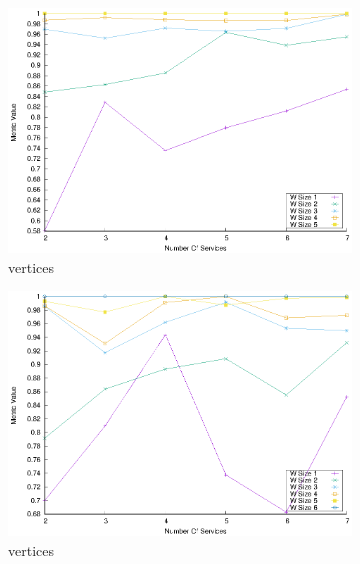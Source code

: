 \begin{figure}[!htb]
\begin{subfigure}{0.48\textwidth}
    \includegraphics[width=\textwidth]{Images/graphs/window_quality_performance_diff_perce_n7_s7_20_100_n5}
    \caption{ vertices}
    \label{fig:quality_window_perce_wide_5n}
  \end{subfigure}
  \hfill
  \begin{subfigure}{0.48\textwidth}
    \includegraphics[width=\textwidth]{Images/graphs/window_quality_performance_diff_perce_n7_s7_20_100_n6}
    \caption{ vertices}
    \label{fig:quality_window_perce_wide_6n}
  \end{subfigure}
  \begin{subfigure}{0.48\textwidth}

\end{subfigure}
\end{figure}
